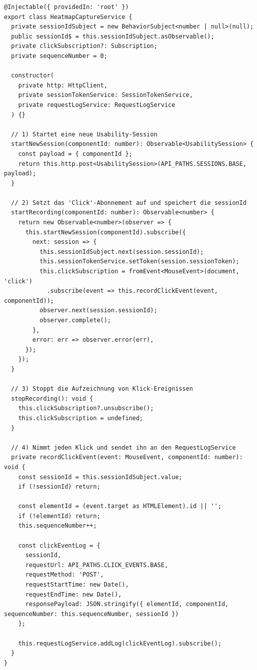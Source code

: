\documentclass[12pt,oneside]{article}
\begin{document}
 
\begin{lstlisting}
@Injectable({ providedIn: 'root' })
export class HeatmapCaptureService {
  private sessionIdSubject = new BehaviorSubject<number | null>(null);
  public sessionId$ = this.sessionIdSubject.asObservable();
  private clickSubscription?: Subscription;
  private sequenceNumber = 0;

  constructor(
    private http: HttpClient,
    private sessionTokenService: SessionTokenService,
    private requestLogService: RequestLogService
  ) {}

  // 1) Startet eine neue Usability-Session
  startNewSession(componentId: number): Observable<UsabilitySession> {
    const payload = { componentId };
    return this.http.post<UsabilitySession>(API_PATHS.SESSIONS.BASE, payload);
  }

  // 2) Setzt das 'Click'-Abonnement auf und speichert die sessionId
  startRecording(componentId: number): Observable<number> {
    return new Observable<number>(observer => {
      this.startNewSession(componentId).subscribe({
        next: session => {
          this.sessionIdSubject.next(session.sessionId);
          this.sessionTokenService.setToken(session.sessionToken);
          this.clickSubscription = fromEvent<MouseEvent>(document, 'click')
            .subscribe(event => this.recordClickEvent(event, componentId));
          observer.next(session.sessionId);
          observer.complete();
        },
        error: err => observer.error(err),
      });
    });
  }

  // 3) Stoppt die Aufzeichnung von Klick-Ereignissen
  stopRecording(): void {
    this.clickSubscription?.unsubscribe();
    this.clickSubscription = undefined;
  }

  // 4) Nimmt jeden Klick und sendet ihn an den RequestLogService
  private recordClickEvent(event: MouseEvent, componentId: number): void {
    const sessionId = this.sessionIdSubject.value;
    if (!sessionId) return;

    const elementId = (event.target as HTMLElement).id || '';
    if (!elementId) return;
    this.sequenceNumber++;

    const clickEventLog = {
      sessionId,
      requestUrl: API_PATHS.CLICK_EVENTS.BASE,
      requestMethod: 'POST',
      requestStartTime: new Date(),
      requestEndTime: new Date(),
      responsePayload: JSON.stringify({ elementId, componentId, sequenceNumber: this.sequenceNumber, sessionId })
    };

    this.requestLogService.addLog(clickEventLog).subscribe();
  }
}
\end{lstlisting}
\end{document}
